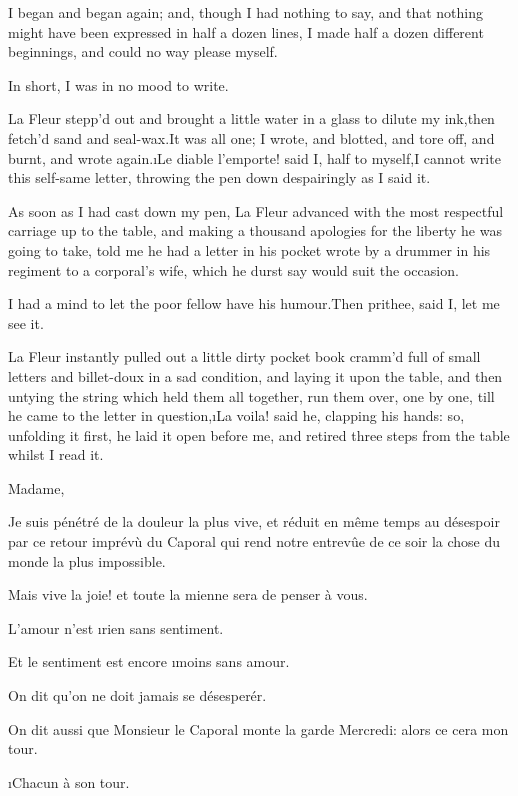 \documentclass[twoside]{article}
\begin{document}
I began and began again; and, though I had nothing to say, and that
nothing might have been expressed in half a dozen lines, I made half a
dozen different beginnings, and could no way please myself.

In short, I was in no mood to write.

La Fleur stepp’d out and brought a little water in a glass to dilute my
ink,\tsk then fetch’d sand and seal-wax.\tsk It was all one; I wrote, and
blotted, and tore off, and burnt, and wrote again.\tsk \i{Le diable l’emporte}!
said I, half to myself,\tsk I cannot write this self-same letter, throwing
the pen down despairingly as I said it.

As soon as I had cast down my pen, La Fleur advanced with the most
respectful carriage up to the table, and making a thousand apologies for
the liberty he was going to take, told me he had a letter in his pocket
wrote by a drummer in his regiment to a corporal’s wife, which he durst
say would suit the occasion.

I had a mind to let the poor fellow have his humour.\tsk Then prithee, said
I, let me see it.

La Fleur instantly pulled out a little dirty pocket book cramm’d full of
small letters and billet-doux in a sad condition, and laying it upon the
table, and then untying the string which held them all together, run them
over, one by one, till he came to the letter in question,\tsk \i{La voila}!
said he, clapping his hands: so, unfolding it first, he laid it open
before me, and retired three steps from the table whilst I read it.






Madame,

Je suis pénétré de la douleur la plus vive, et réduit en même temps au
désespoir par ce retour imprévù du Caporal qui rend notre entrevûe de ce
soir la chose du monde la plus impossible.

Mais vive la joie! et toute la mienne sera de penser à vous.

L’amour n’est \i{rien} sans sentiment.

Et le sentiment est encore \i{moins} sans amour.

On dit qu’on ne doit jamais se désesperér.

On dit aussi que Monsieur le Caporal monte la garde Mercredi: alors ce
cera mon tour.

                           \i{Chacun à son tour}.
\end{document}
